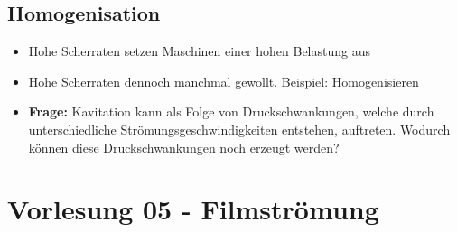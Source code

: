 \documentclass[a4paper,10pt,twoside]{article}
\begin{document}
\subsection{Homogenisation}
\begin{itemize}
\item Hohe Scherraten setzen Maschinen einer hohen Belastung aus
\item Hohe Scherraten dennoch manchmal gewollt. Beispiel: Homogenisieren
\item \qssmall{}\textbf{Frage:} Kavitation kann als Folge von Druckschwankungen, welche durch unterschiedliche Strömungsgeschwindigkeiten entstehen, auftreten. Wodurch können diese Druckschwankungen noch erzeugt werden?
\end{itemize}




\pagebreak
\section*{Vorlesung 05 - Filmströmung}\addtocounter{section}{1}
\end{document}

